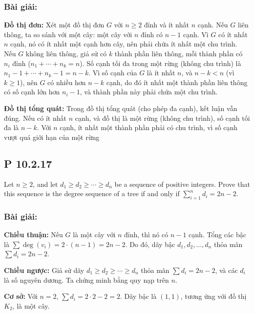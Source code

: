 \documentclass[a4paper,12pt]{article}
\begin{document}
\subsubsection*{Bài giải:}
 \textbf{Đồ thị đơn:} Xét một đồ thị đơn \( G \) với \( n \geq 2 \) đỉnh và ít nhất \( n \) cạnh. Nếu \( G \) liên thông, ta so sánh với một cây: một cây với \( n \) đỉnh có \( n - 1 \) cạnh. Vì \( G \) có ít nhất \( n \) cạnh, nó có ít nhất một cạnh hơn cây, nên phải chứa ít nhất một chu trình. Nếu \( G \) không liên thông, giả sử có \( k \) thành phần liên thông, mỗi thành phần có \( n_i \) đỉnh (\( n_1 + \cdots + n_k = n \)). Số cạnh tối đa trong một rừng (không chu trình) là \( n_1 - 1 + \cdots + n_k - 1 = n - k \). Vì số cạnh của \( G \) là ít nhất \( n \), và \( n - k < n \) (vì \( k \geq 1 \)), nên \( G \) có nhiều hơn \( n - k \) cạnh, do đó ít nhất một thành phần liên thông có số cạnh lớn hơn \( n_i - 1 \), và thành phần này phải chứa một chu trình.

 \textbf{Đồ thị tổng quát:} Trong đồ thị tổng quát (cho phép đa cạnh), kết luận vẫn đúng. Nếu có ít nhất \( n \) cạnh, và đồ thị là một rừng (không chu trình), số cạnh tối đa là \( n - k \). Với \( n \) cạnh, ít nhất một thành phần phải có chu trình, vì số cạnh vượt quá giới hạn của một rừng

\subsection*{P 10.2.17}
Let \( n \geq 2 \), and let \( d_1 \geq d_2 \geq \cdots \geq d_n \) be a sequence of positive integers. Prove that this sequence is the degree sequence of a tree if and only if \( \sum_{i=1}^n d_i = 2n - 2 \).

\subsubsection*{Bài giải:}
 \textbf{Chiều thuận:} Nếu \( G \) là một cây với \( n \) đỉnh, thì nó có \( n - 1 \) cạnh. Tổng các bậc là \( \sum \deg(v_i) = 2 \cdot (n - 1) = 2n - 2 \). Do đó, dãy bậc \( d_1, d_2, \ldots, d_n \) thỏa mãn \( \sum d_i = 2n - 2 \).

 \textbf{Chiều ngược:} Giả sử dãy \( d_1 \geq d_2 \geq \cdots \geq d_n \) thỏa mãn \( \sum d_i = 2n - 2 \), và các \( d_i \) là số nguyên dương. Ta chứng minh bằng quy nạp trên \( n \).

  \textbf{Cơ sở:} Với \( n = 2 \), \( \sum d_i = 2 \cdot 2 - 2 = 2 \). Dãy bậc là \( (1, 1) \), tương ứng với đồ thị \( K_2 \), là một cây.
\end{document}
